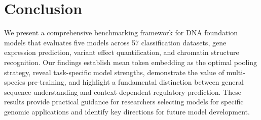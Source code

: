 \documentclass[11pt]{article}
\begin{document}
\section{Conclusion}

We present a comprehensive benchmarking framework for DNA foundation models that evaluates five models across 57 classification datasets, gene expression prediction, variant effect quantification, and chromatin structure recognition. Our findings establish mean token embedding as the optimal pooling strategy, reveal task-specific model strengths, demonstrate the value of multi-species pre-training, and highlight a fundamental distinction between general sequence understanding and context-dependent regulatory prediction. These results provide practical guidance for researchers selecting models for specific genomic applications and identify key directions for future model development.



\end{document}
